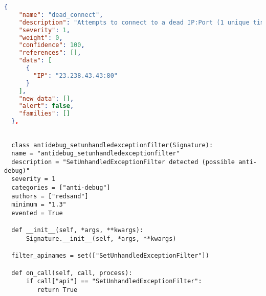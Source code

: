 \begin{lstlisting}[language=json, caption={Example of signature part entry in \emph{report.json}},captionpos=b, label={lst:signature_example}]
  {
    "name": "dead_connect",
    "description": "Attempts to connect to a dead IP:Port (1 unique times)",
    "severity": 1,
    "weight": 0,
    "confidence": 100,
    "references": [],
    "data": [
      {
        "IP": "23.238.43.43:80"
      }
    ],
    "new_data": [],
    "alert": false,
    "families": []
  },
\end{lstlisting}


\begin{lstlisting}[language=mypython, caption={Example of signature implementation},captionpos=b, label={lst:signatureimpl}]
  
  class antidebug_setunhandledexceptionfilter(Signature):
  name = "antidebug_setunhandledexceptionfilter"
  description = "SetUnhandledExceptionFilter detected (possible anti-debug)"
  severity = 1
  categories = ["anti-debug"]
  authors = ["redsand"]
  minimum = "1.3"
  evented = True

  def __init__(self, *args, **kwargs):
      Signature.__init__(self, *args, **kwargs)

  filter_apinames = set(["SetUnhandledExceptionFilter"])

  def on_call(self, call, process):
      if call["api"] == "SetUnhandledExceptionFilter":
         return True
  
\end{lstlisting}


